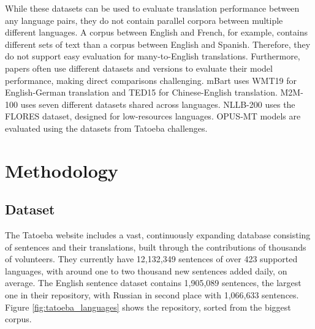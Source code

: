 \documentclass[a4paper, 11pt]{article}
\begin{document}
While these datasets can be used to evaluate translation performance between any language pairs, they do not contain parallel corpora between multiple different languages. A corpus between English and French, for example, contains different sets of text than a corpus between English and Spanish. Therefore, they do not support easy evaluation for many-to-English translations. Furthermore, papers often use different datasets and versions to evaluate their model performance, making direct comparisons challenging. mBart \cite{liu-2020-mbart} uses WMT19 for English-German translation and TED15 for Chinese-English translation. M2M-100 \cite{fan-2020-m2m100} uses seven different datasets shared across languages. NLLB-200  \cite{nllb200-2020} uses the FLORES dataset, designed for low-resources languages. OPUS-MT \cite{tiedemann-2023-democratizing,tiedemann-2020-opus-mt} models are evaluated using the datasets from Tatoeba challenges.


\section{Methodology}

\subsection{Dataset}

The Tatoeba website \cite{tatoeba} includes a vast, continuously expanding database consisting of sentences and their translations, built through the contributions of thousands of volunteers. They currently have 12,132,349 sentences of over 423 supported languages, with around one to two thousand new sentences added daily, on average. The English sentence dataset contains 1,905,089 sentences, the largest one in their repository, with Russian in second place with 1,066,633 sentences. Figure \ref{fig:tatoeba_languages} shows the repository, sorted from the biggest corpus.
\end{document}
